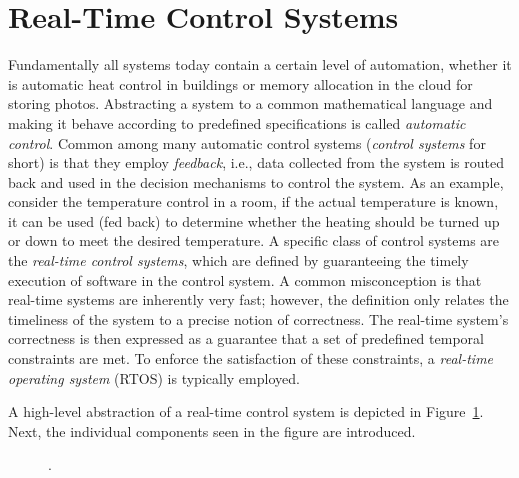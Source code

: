 \section{Real-Time Control Systems}%
\label{sec:intro:rts}%
%
%
Fundamentally all systems today contain a certain level of automation, whether it is automatic heat control in buildings or memory allocation in the cloud for storing photos.
Abstracting a system to a common mathematical language and making it behave according to predefined specifications is called \emph{automatic control}.
Common among many automatic control systems (\emph{control systems} for short) is that they employ \emph{feedback}, i.e., data collected from the system is routed back and used in the decision mechanisms to control the system.
As an example, consider the temperature control in a room, if the actual temperature is known, it can be used (fed back) to determine whether the heating should be turned up or down to meet the desired temperature.
A specific class of control systems are the \emph{real-time control systems}, which are defined by guaranteeing the timely execution of software in the control system.
A common misconception is that real-time systems are inherently very fast; however, the definition only relates the timeliness of the system to a precise notion of correctness.
The real-time system's correctness is then expressed as a guarantee that a set of predefined temporal constraints are met.
To enforce the satisfaction of these constraints, a \emph{real-time operating system} (RTOS) is typically employed.

A high-level abstraction of a real-time control system is depicted in Figure~\ref{fig:high-level-abstraction}.
Next, the individual components seen in the figure are introduced. 
%
\begin{figure}[t]
    \centering
    \caption{.}%
    \label{fig:high-level-abstraction}%
\end{figure}


